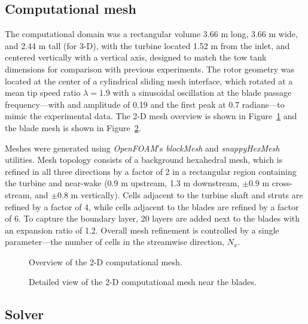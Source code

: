\subsection{Computational mesh}

The computational domain was a rectangular volume 3.66 m long, 3.66 m wide, and
2.44 m tall (for 3-D), with the turbine located 1.52 m from the inlet, and
centered vertically with a vertical axis, designed to match the tow tank
dimensions for comparison with previous experiments. The rotor geometry was
located at the center of a cylindrical sliding mesh interface, which rotated at
a mean tip speed ratio $\lambda=1.9$ with a sinusoidal oscillation at the blade
passage frequency---with and amplitude of 0.19 and the first peak at 0.7
radians---to mimic the experimental data. The 2-D mesh overview is shown in
Figure~\ref{fig:mesh} and the blade mesh is shown in
Figure~\ref{fig:blade-mesh}.

Meshes were generated using \textit{OpenFOAM}'s \textit{blockMesh} and
\textit{snappyHexMesh} utilities. Mesh topology consists of a background
hexahedral mesh, which is refined in all three directions by a factor of 2 in a
rectangular region containing the turbine and near-wake (0.9 m upstream, 1.3 m
downstream, $\pm 0.9$ m cross-stream, and $\pm 0.8$ m vertically). Cells
adjacent to the turbine shaft and struts are refined by a factor of 4, while
cells adjacent to the blades are refined by a factor of 6. To capture the
boundary layer, 20 layers are added next to the blades with an expansion ratio
of 1.2. Overall mesh refinement is controlled by a single parameter---the number
of cells in the streamwise direction, $N_x$.

\begin{figure}[ht]

    \caption{Overview of the 2-D computational mesh.}

    \label{fig:mesh}
\end{figure}


\begin{figure}[ht]

    \caption{Detailed view of the 2-D computational mesh near the blades.}

    \label{fig:blade-mesh}
\end{figure}


\subsection{Solver}

